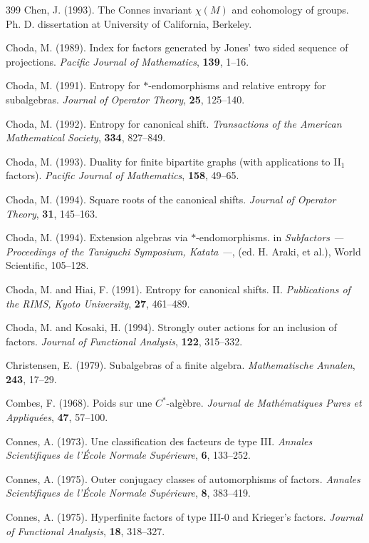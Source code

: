 \documentclass[12pt]{article}
\theoremstyle{plain}
\theoremstyle{definition}
\numberwithin{equation}{section}
\begin{document}
\begin{thebibliography} {399}
Chen, J. (1993).
The Connes invariant $\chi(M)$ and cohomology of groups. 
Ph. D. dissertation at University of California, Berkeley.

Choda, M. (1989).
Index for factors generated by Jones' two sided 
sequence of projections. 
{\em Pacific Journal of Mathematics}, {\bf 139}, 1--16.

Choda, M. (1991).
Entropy for $*$-endomorphisms and relative entropy 
for subalgebras. {\em Journal of Operator Theory},
{\bf 25}, 125--140.

Choda, M. (1992).
Entropy for canonical shift.
{\em Transactions of the American Mathematical Society}, 
{\bf 334}, 827--849.

Choda, M. (1993).
Duality for finite bipartite graphs
(with applications to II$_1$ factors).
{\em Pacific Journal of Mathematics}, {\bf 158}, 49--65.

Choda, M. (1994).
Square roots of the canonical shifts.
{\em Journal of Operator Theory}, {\bf 31}, 145--163.

Choda, M. (1994).
Extension algebras via $*$-endomorphisms.
in {\em Subfactors ---
Proceedings of the Taniguchi Symposium, Katata ---},
(ed. H. Araki, et al.),
World Scientific, 105--128.

Choda, M. and Hiai, F. (1991).
Entropy for canonical shifts. II.
{\em Publications of the RIMS, Kyoto University},
{\bf 27}, 461--489.							

Choda, M. and Kosaki, H. (1994).
Strongly outer actions for an inclusion of factors.
{\em Journal of Functional Analysis}, {\bf 122}, 
315--332.

Christensen, E. (1979).
Subalgebras of a finite algebra.
{\em Mathematische Annalen}, {\bf 243}, 17--29.

Combes, F. (1968).
Poids sur une $C^*$-alg\`ebre.
{\em Journal de Math\'ematiques Pures et 
Appliqu\'ees}, {\bf 47}, 57--100.

Connes, A. (1973).
Une classification des facteurs de type III.
{\em Annales Scientifiques de l'\'Ecole Normale Sup\'erieure},
{\bf 6}, 133--252.

Connes, A. (1975).
Outer conjugacy classes of automorphisms of factors.
{\em Annales Scientifiques de l'\'Ecole Normale Sup\'erieure},
{\bf 8}, 383--419.

Connes, A. (1975).
Hyperfinite factors of type III-0 and Krieger's factors. 
{\em Journal of Functional Analysis},
{\bf 18}, 318--327.


\end{thebibliography}
\end{document}
